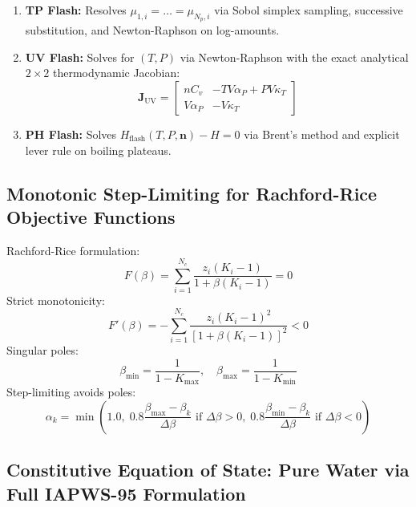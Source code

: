 \documentclass[11pt,a4paper]{article}
\begin{document}
\begin{enumerate}[leftmargin=*]
    \item \textbf{TP Flash:} Resolves $\mu_{1, i} = \dots = \mu_{N_p, i}$ via Sobol simplex sampling, successive substitution, and Newton-Raphson on log-amounts.
    \item \textbf{UV Flash:} Solves for $(T, P)$ via Newton-Raphson with the exact analytical $2 \times 2$ thermodynamic Jacobian:
    \begin{equation}
    \mathbf{J}_{\text{UV}} = \begin{bmatrix} n C_v & -T V \alpha_P + P V \kappa_T \\ V \alpha_P & -V \kappa_T \end{bmatrix}
    \end{equation}
    \item \textbf{PH Flash:} Solves $H_{\text{flash}}(T, P, \mathbf{n}) - H = 0$ via Brent's method and explicit lever rule on boiling plateaus.
\end{enumerate}

\subsection{Monotonic Step-Limiting for Rachford-Rice Objective Functions}

Rachford-Rice formulation:
\begin{equation}
F(\beta) = \sum_{i=1}^{N_c} \frac{z_i (K_i - 1)}{1 + \beta (K_i - 1)} = 0
\end{equation}
Strict monotonicity:
\begin{equation}
F'(\beta) = -\sum_{i=1}^{N_c} \frac{z_i (K_i - 1)^2}{[1 + \beta (K_i - 1)]^2} < 0
\end{equation}
Singular poles:
\begin{equation}
\beta_{\min} = \frac{1}{1 - K_{\max}}, \quad \beta_{\max} = \frac{1}{1 - K_{\min}}
\end{equation}
Step-limiting avoids poles:
\begin{equation}
\alpha_k = \min\left( 1.0, \; 0.8 \frac{\beta_{\max} - \beta_k}{\Delta \beta} \text{ if } \Delta \beta > 0, \; 0.8 \frac{\beta_{\min} - \beta_k}{\Delta \beta} \text{ if } \Delta \beta < 0 \right)
\end{equation}

\subsection{Constitutive Equation of State: Pure Water via Full IAPWS-95 Formulation}
\end{document}
